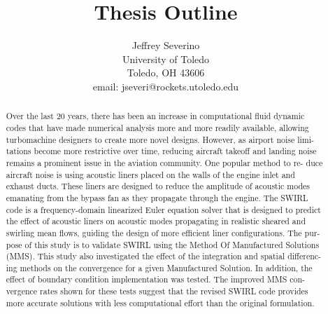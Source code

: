 \documentclass[a4paper]{report}
\begin{document}
\begin{titlepage}
    \title{Thesis Outline}
    \author{ Jeffrey Severino \\
        University of Toledo \\
        Toledo, OH  43606 \\
    email: jseveri@rockets.utoledo.edu}


    \maketitle

\end{titlepage}
\begin{abstract}
   Over the last 20 years, there has been an increase in computational fluid dynamic
   codes that have made numerical analysis more and more readily available, allowing
   turbomachine designers to create more novel designs. However, as airport noise limi-
   tations become more restrictive over time, reducing aircraft takeoff and landing noise
   remains a prominent issue in the aviation community. One popular method to re-
   duce aircraft noise is using acoustic liners placed on the walls of the engine inlet and
   exhaust ducts. These liners are designed to reduce the amplitude of acoustic modes
   emanating from the bypass fan as they propagate through the engine. The SWIRL
   code is a frequency-domain linearized Euler equation solver that is designed to predict
   the effect of acoustic liners on acoustic modes propagating in realistic sheared and
   swirling mean flows, guiding the design of more efficient liner configurations. The pur-
   pose of this study is to validate SWIRL using the Method Of Manufactured Solutions
   (MMS). This study also investigated the effect of the integration and spatial differenc-
   ing methods on the convergence for a given Manufactured Solution. In addition, the
   effect of boundary condition implementation was tested. The improved MMS con-
   vergence rates shown for these tests suggest that the revised SWIRL code provides
   more accurate solutions with less computational effort than the original formulation.
\end{abstract}
\end{document}
